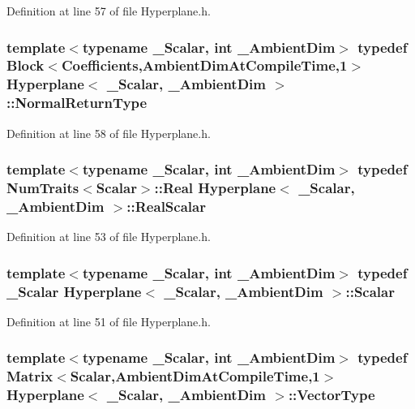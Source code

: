 Definition at line 57 of file Hyperplane.\-h.

\hypertarget{class_hyperplane_afe891d31b5136e497ed034c658659539}{
\subsubsection[{Normal\-Return\-Type}]{\setlength{\rightskip}{0pt plus 5cm}template$<$typename \-\_\-\-Scalar, int \-\_\-\-Ambient\-Dim$>$ typedef {\bf Block}$<${\bf Coefficients},Ambient\-Dim\-At\-Compile\-Time,1$>$ {\bf Hyperplane}$<$ \-\_\-\-Scalar, \-\_\-\-Ambient\-Dim $>$\-::{\bf Normal\-Return\-Type}}}\label{class_hyperplane_afe891d31b5136e497ed034c658659539}


Definition at line 58 of file Hyperplane.\-h.

\hypertarget{class_hyperplane_a4004d38aa17f44855be49535482bb2b1}{
\subsubsection[{Real\-Scalar}]{\setlength{\rightskip}{0pt plus 5cm}template$<$typename \-\_\-\-Scalar, int \-\_\-\-Ambient\-Dim$>$ typedef {\bf Num\-Traits}$<${\bf Scalar}$>$\-::Real {\bf Hyperplane}$<$ \-\_\-\-Scalar, \-\_\-\-Ambient\-Dim $>$\-::{\bf Real\-Scalar}}}\label{class_hyperplane_a4004d38aa17f44855be49535482bb2b1}


Definition at line 53 of file Hyperplane.\-h.

\hypertarget{class_hyperplane_a7aa8093dff10cabfce189f280fb14069}{
\subsubsection[{Scalar}]{\setlength{\rightskip}{0pt plus 5cm}template$<$typename \-\_\-\-Scalar, int \-\_\-\-Ambient\-Dim$>$ typedef \-\_\-\-Scalar {\bf Hyperplane}$<$ \-\_\-\-Scalar, \-\_\-\-Ambient\-Dim $>$\-::{\bf Scalar}}}\label{class_hyperplane_a7aa8093dff10cabfce189f280fb14069}


Definition at line 51 of file Hyperplane.\-h.

\hypertarget{class_hyperplane_ae700a24e287a31cece3618e1e1bc6385}{
\subsubsection[{Vector\-Type}]{\setlength{\rightskip}{0pt plus 5cm}template$<$typename \-\_\-\-Scalar, int \-\_\-\-Ambient\-Dim$>$ typedef {\bf Matrix}$<${\bf Scalar},Ambient\-Dim\-At\-Compile\-Time,1$>$ {\bf Hyperplane}$<$ \-\_\-\-Scalar, \-\_\-\-Ambient\-Dim $>$\-::{\bf Vector\-Type}}}\label{class_hyperplane_ae700a24e287a31cece3618e1e1bc6385}


